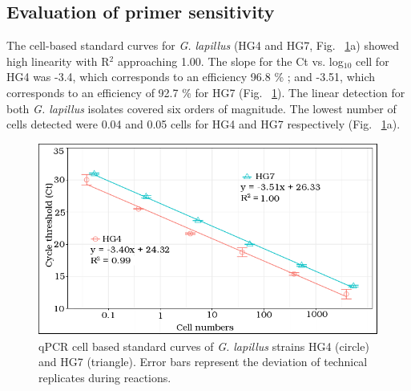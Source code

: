 \documentclass[12pt]{article}
\begin{document}
 
\subsection*{Evaluation of primer sensitivity}
\FloatBarrier
The cell-based standard curves for \emph{G. lapillus} (HG4 and HG7, Fig. ~\ref{fig:stdCurve}a) showed high linearity with R$^{2}$ approaching 1.00. 
The slope for the Ct vs. log$_{10}$ cell for HG4  was -3.4, which corresponds to an efficiency 96.8 \%%
; and -3.51, which corresponds to an efficiency of 92.7 \% %
for HG7 (Fig. ~\ref{fig:stdCurve}). 
The linear detection for both \emph{G. lapillus} isolates covered six orders of magnitude. 
The lowest number of cells detected were 0.04 and 0.05 cells for HG4 and HG7 respectively (Fig. ~\ref{fig:stdCurve}a).
\begin{figure}
\includegraphics[scale=.85]{Hero_qpcr-figs/Fig3.png}
\caption{qPCR cell based standard curves of \emph{G. lapillus} strains HG4 (circle) and HG7 (triangle). Error bars represent the deviation of technical replicates during reactions.}%
\label{fig:stdCurve}
\end{figure}
\end{document}

